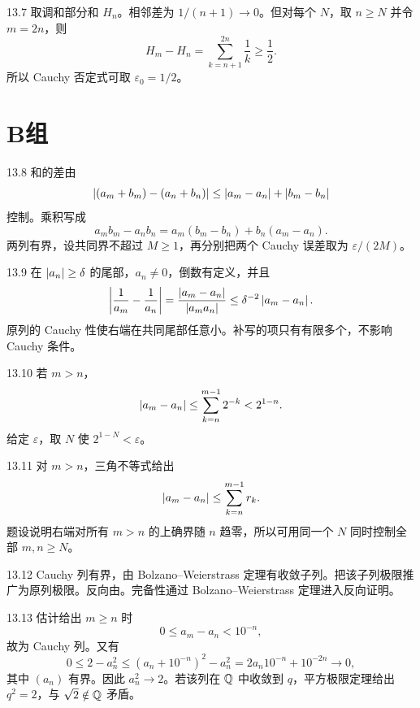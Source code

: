\begin{solution}{13.7}
取调和部分和 \(H_n\)。相邻差为 \(1/(n+1)\to0\)。但对每个 \(N\)，取
\(n\ge N\) 并令 \(m=2n\)，则
\[
 H_m-H_n=\sum_{k=n+1}^{2n}\frac1k\ge\frac12.
\]
所以 Cauchy 否定式可取 \(\varepsilon_0=1/2\)。
\end{solution}

\section*{B组}

\begin{solution}{13.8}
和的差由
\[
 \left|(a_m+b_m)-(a_n+b_n)\right|
 \le\left|a_m-a_n\right|+\left|b_m-b_n\right|
\]
控制。乘积写成
\[
 a_mb_m-a_nb_n=a_m(b_m-b_n)+b_n(a_m-a_n).
\]
两列有界，设共同界不超过 \(M\ge1\)，再分别把两个 Cauchy 误差取为 \(\varepsilon/(2M)\)。
\end{solution}

\begin{solution}{13.9}
在 \(\left|a_n\right|\ge\delta\) 的尾部，\(a_n\ne0\)，倒数有定义，并且
\[
 \left|\frac1{a_m}-\frac1{a_n}\right|
 =\frac{\left|a_m-a_n\right|}{\left|a_ma_n\right|}
 \le\delta^{-2}\left|a_m-a_n\right|.
\]
原列的 Cauchy 性使右端在共同尾部任意小。补写的项只有有限多个，不影响 Cauchy 条件。
\end{solution}

\begin{solution}{13.10}
若 \(m>n\)，
\[
 \left|a_m-a_n\right|
 \le\sum_{k=n}^{m-1}2^{-k}<2^{1-n}.
\]
给定 \(\varepsilon\)，取 \(N\) 使 \(2^{1-N}<\varepsilon\)。
\end{solution}

\begin{solution}{13.11}
对 \(m>n\)，三角不等式给出
\[
 \left|a_m-a_n\right|\le\sum_{k=n}^{m-1}r_k.
\]
题设说明右端对所有 \(m>n\) 的上确界随 \(n\) 趋零，所以可用同一个 \(N\) 同时控制全部 \(m,n\ge N\)。
\end{solution}

\begin{solution}{13.12}
Cauchy 列有界，由 Bolzano--Weierstrass 定理有收敛子列。把该子列极限推广为原列极限。反向由。完备性通过 Bolzano--Weierstrass 定理进入反向证明。
\end{solution}

\begin{solution}{13.13}
估计给出 \(m\ge n\) 时
\[
 0\le a_m-a_n<10^{-n},
\]
故为 Cauchy 列。又有
\[
 0\le2-a_n^2
 \le(a_n+10^{-n})^2-a_n^2
 =2a_n10^{-n}+10^{-2n}\longrightarrow0,
\]
其中 \((a_n)\) 有界。因此 \(a_n^2\to2\)。若该列在 \(\mathbb{Q}\) 中收敛到 \(q\)，平方极限定理给出 \(q^2=2\)，与
\(\sqrt2\notin\mathbb{Q}\) 矛盾。
\end{solution}

